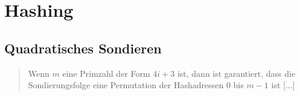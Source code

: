\section{Hashing}

\subsection{Quadratisches Sondieren}

\blockquote[{\cite[207]{OW17d}}]{
Wenn $m$ eine Primzahl der Form $4i+3$ ist, dann ist garantiert, dass die Sondierungsfolge eine Permutation der Hashadressen 0 bis $m-1$ ist [...]
}
